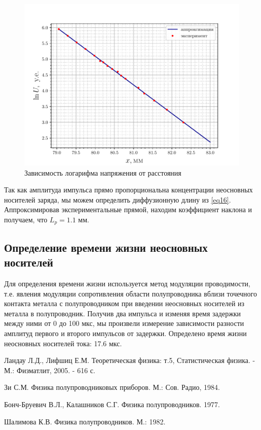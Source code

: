 \begin{figure}[h!]
	\centering
	\includegraphics[width=0.7\linewidth]{fig/1.pdf}
	\caption{Зависимость логарифма напряжения от расстояния}
	\label{fig:1}
\end{figure}
Так как амплитуда импульса прямо пропорциональна концентрации неосновных носителей заряда, мы можем определить диффузионную длину из \eqref{eq16}.
Аппроксимировав экспериментальные прямой, находим коэффициент наклона и получаем, что
$L_p = 1.1 \text{ мм}$. 

\subsection{Определение времени жизни неосновных носителей}
Для определения времени жизни используется метод модуляции проводимости, т.е. явления модуляции сопротивления области полупроводника вблизи точечного контакта металла с полупроводником при введении неосновных носителей из металла в полупроводник.
Получив два импульса и изменяя время задержки между ними от 0 до 100 мкс, мы произвели измерение зависимости разности амплитуд первого и второго импульсов от задержки. Определено время жизни неосновных носителей тока: 17.6 мкс.





\begin{thebibliography}{99}
 Ландау Л.Д., Лифшиц Е.М. Теоретическая физика: т.5, Статистическая физика. - М.: Физматлит, 2005. - 616 с.

 Зи С.М. Физика полупроводниковых приборов. М.: Сов. Радио, 1984.

   Бонч-Бруевич В.Л., Калашников С.Г. Физика полупроводников. 1977.

    Шалимова К.В. Физика полупроводников. М.: 1982.
\end{thebibliography}


